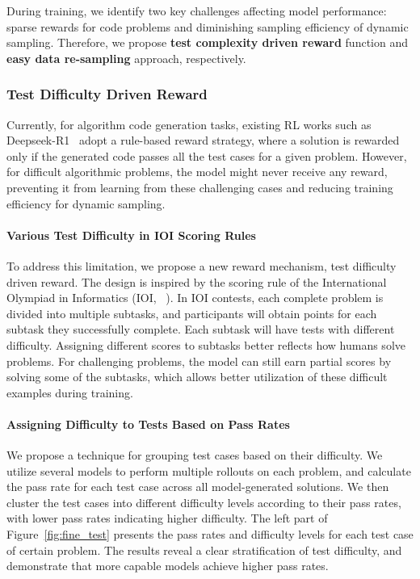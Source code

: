 \documentclass[11pt, a4paper, logo, copyright, nonumbering]{xiaomi}
\newcommand{\rone}{Deepseek-R1}
\newcommand{\codereward}{test difficulty driven reward}
\begin{document}
During training, we identify two key challenges affecting model performance: sparse rewards for code problems and diminishing sampling efficiency of dynamic sampling. 
Therefore, we propose \textbf{test complexity driven reward} function and \textbf{easy data re-sampling} approach, respectively.


\subsubsection{Test Difficulty Driven Reward}
\label{sec:code_reward}
Currently, for algorithm code generation tasks, existing RL works such as \rone{}~\cite{guo2025deepseek} adopt a rule-based reward strategy, where a solution is rewarded only if the generated code passes all the test cases for a given problem. However, for difficult algorithmic problems, the model might never receive any reward, preventing it from learning from these challenging cases and reducing training efficiency for dynamic sampling.


\paragraph{Various Test Difficulty in IOI Scoring Rules}
To address this limitation, we propose a new reward mechanism, \codereward{}. The design is inspired by the scoring rule of the International Olympiad in Informatics (IOI, ~\citealt{ioi}). In IOI contests, each complete problem is divided into multiple subtasks, and participants will obtain points for each subtask they successfully complete. Each subtask will have tests with different difficulty. 
Assigning different scores to subtasks better reflects how humans solve problems. 
For challenging problems, the model can still earn partial scores by solving some of the subtasks, which allows better utilization of these difficult examples during training.

\paragraph{Assigning Difficulty to Tests Based on Pass Rates}
We propose a technique for grouping test cases based on their difficulty. We utilize several models to perform multiple rollouts on each problem, and calculate the pass rate for each test case across all model-generated solutions. We then cluster the test cases into different difficulty levels according to their pass rates, with lower pass rates indicating higher difficulty.
The left part of Figure~\ref{fig:fine_test} presents the pass rates and difficulty levels for each test case of certain problem. The results reveal a clear stratification of test difficulty, and demonstrate that more capable models achieve higher pass rates.
\end{document}
